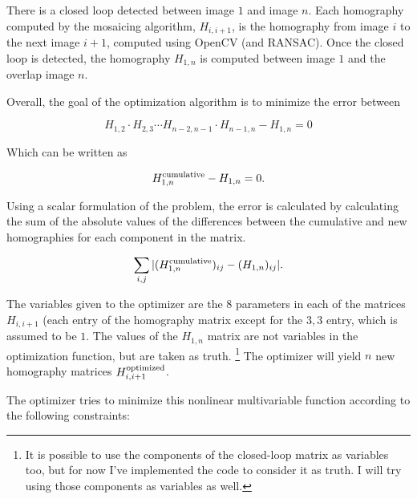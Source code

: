 \documentclass{article}
\begin{document}
There is a closed loop detected between image $1$ and image $n$. Each
homography computed by the mosaicing algorithm, $H_{i, i + 1}$, is the
homography from image $i$ to the next image $i + 1$, computed using OpenCV (and
RANSAC). Once the closed loop is detected, the homography $H_{1, n}$ is
computed between image $1$ and the overlap image $n$. 

Overall, the goal of the optimization algorithm is to minimize the error
between
 
\[H_{1, 2} \cdot H_{2, 3} \cdots H_{n - 2, n - 1} \cdot H_{n - 1, n} - H_{1, n} = 0\]

Which can be written as

\[H_{1, n}^{\textnormal{cumulative}} - H_{1, n} = 0.\]

Using a scalar formulation of the problem, the error is calculated by
calculating the sum of the absolute values of the differences between the
cumulative and new homographies for each component in the matrix.

\[\sum_{i,j} |(H_{1, n}^{\textnormal{cumulative}})_{ij} - (H_{1, n})_{ij}|.\]

The variables given to the optimizer are the $8$ parameters in each of the
matrices $H_{i, i + 1}$ (each entry of the homography matrix except for the $3,
3$ entry, which is assumed to be $1$. The values of the $H_{1, n}$ matrix are
not variables in the optimization function, but are taken as truth.
\footnote{It is possible to use the components of the closed-loop matrix as
variables too, but for now I've implemented the code to consider it as truth. I
will try using those components as variables as well.} The optimizer will yield
$n$ new homography matrices $H_{i, i+1}^{\textnormal{optimized}}$. 

The optimizer tries to minimize this nonlinear multivariable function according
to the following constraints:
\end{document}
